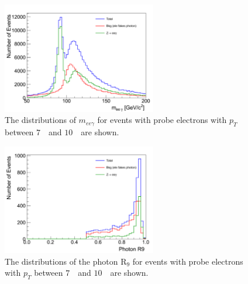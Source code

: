 \documentclass{cmspaper}
\begin{document}
\begin{figure}[htb]
  \begin{center}
    \includegraphics[width=0.6\textwidth]{figures/MassEEGamma_AfterPixelVeto.pdf}
    \caption{The distributions of $m_{ee\gamma}$ for events with probe electrons with $p_{T}$
      between $7$~\GeV\ and $10$~\GeV\ are shown.        
    }
    \label{fig:MassEEGamma_AfterPixelVeto}
  \end{center}
\end{figure}

\begin{figure}[htb]
  \begin{center}
    \includegraphics[width=0.6\textwidth]{figures/R9_AfterLowPtSelection.pdf}
    \caption{The distributions of the photon $\mathrm{R}_{9}$ for events with probe electrons with $p_{T}$
      between $7$~\GeV\ and $10$~\GeV\ are shown. 
    }
    \label{fig:PhotonR9_LowPtProbes}
  \end{center}
\end{figure}
\end{document}
